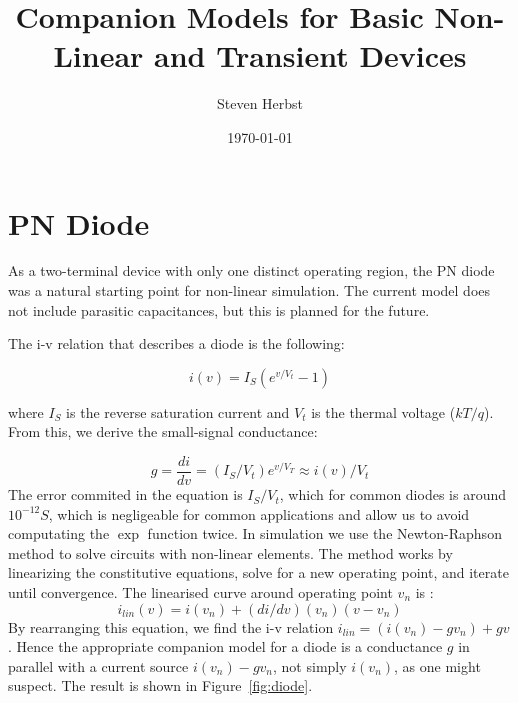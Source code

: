\documentclass{article}
\begin{document}
\title{Companion Models for Basic Non-Linear and Transient Devices}
\author{Steven Herbst}
\date{\today}

\maketitle

\section{PN Diode}

As a two-terminal device with only one distinct operating region, the PN diode was a natural starting point for non-linear simulation.  The current model does not include parasitic capacitances, but this is planned for the future.

The i-v relation that describes a diode is the following:

\begin{equation}
i(v) = I_S(e^{v/V_t}-1)
\end{equation}

where $I_S$ is the reverse saturation current and $V_t$ is the thermal voltage ($kT/q$).  From this, we derive the small-signal conductance:

\begin{equation}
g = \frac{di}{dv} = (I_S/V_t) e^{v/V_T} \approx i(v)/V_t
\end{equation}
The error commited in the equation is $I_S / V_t$, which for common diodes is around $10^{-12} S$, which is negligeable for common applications and allow us to avoid computating the $\exp$ function twice.
In simulation we use the Newton-Raphson method to solve circuits with non-linear elements. The method works by linearizing the constitutive equations, solve for a new operating point, and iterate until convergence. The linearised curve around operating point $v_n$ is :
\begin{equation}
i_{lin}(v) = i(v_n) + (di/dv)(v_n) (v - v_n)
\end{equation}
By rearranging this equation, we find the i-v relation $i_{lin}=(i(v_n)-gv_n)+gv$.  Hence the appropriate companion model for a diode is a conductance $g$ in parallel with a current source $i(v_n)-gv_n$, not simply $i(v_n)$, as one might suspect.  The result is shown in Figure~\ref{fig:diode}.
\end{document}

